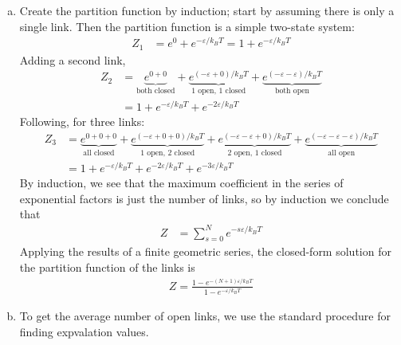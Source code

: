 \begin{enumerate}[a.]
    \item
        Create the partition function by induction; start by assuming there is
        only a single link. Then the partition function is a simple two-state
        system:
        \begin{align*}
            Z_1 &= e^0 + e^{-\varepsilon /k_BT} = 1 + e^{-\varepsilon /k_BT}
        \end{align*}
        Adding a second link,
        \begin{align*}
            Z_2 &= \underbrace{e^{0+0}}_{\text{both closed}} +
                \underbrace{e^{(-\varepsilon +0)/k_BT}}_{\text{1 open, 1 closed}} +
                \underbrace{e^{(-\varepsilon -\varepsilon )/k_BT}}_{\text{both open}}
            \\
            {} &= 1 + e^{-\varepsilon /k_BT} + e^{-2\varepsilon /k_BT}
        \end{align*}
        Following, for three links:
        \begin{align*}
            Z_3 &= \underbrace{e^{0+0+0}}_{\text{all closed}} +
                \underbrace{e^{(-\varepsilon +0+0)/k_BT}}_{\text{1 open, 2 closed}} +
                \underbrace{e^{(-\varepsilon -\varepsilon +0)/k_BT}}_{\text{2 open, 1 closed}} +
                \underbrace{e^{(-\varepsilon -\varepsilon -\varepsilon )/k_BT}}_{\text{all open}}
            \\
            {} &= 1 + e^{-\varepsilon /k_BT} + e^{-2\varepsilon /k_BT} + e^{-3\varepsilon /k_BT}
        \end{align*}
        By induction, we see that the maximum coefficient in the series of
        exponential factors is just the number of links, so by induction we
        conclude that
        \begin{align*}
            Z &= \sum_{s=0}^{N} e^{-s\varepsilon /k_BT}
        \end{align*}
        Applying the results of a finite geometric series, the closed-form
        solution for the partition function of the links is
        \begin{align}
            \boxed{
            Z = \frac{1 - e^{-(N+1)\varepsilon /k_BT}}{1 - e^{-\varepsilon /k_BT}}
            }
        \end{align}
    \item
        To get the average number of open links, we use the standard
        procedure for finding expvalation values.
        \begin{align*}

\end{align*}
\end{enumerate}
